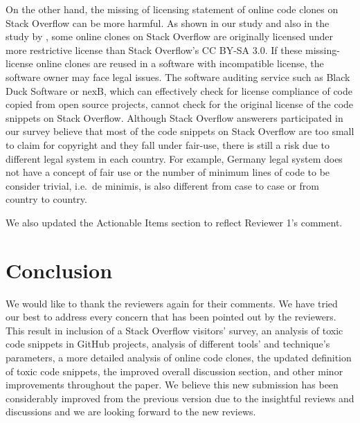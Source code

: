 \documentclass[a4paper,twoside,10pt]{reviewresponse}
\begin{document}
On the other hand, the missing of licensing statement of online code clones on Stack Overflow can be more harmful. As shown in our study and also in the study by \cite{An2017}, some online clones on Stack Overflow are originally licensed under more restrictive license than Stack Overflow's CC BY-SA 3.0. If these missing-license online clones are reused in a software with incompatible license, the software owner may face legal issues. The software auditing service such as Black Duck Software or nexB, which can effectively check for license compliance of code copied from open source projects, cannot check for the original license of the code snippets on Stack Overflow. Although Stack Overflow answerers participated in our survey believe that most of the code snippets on Stack Overflow are too small to claim for copyright and they fall under fair-use, there is still a risk due to different legal system in each country. For example, Germany legal system does not have a concept of fair use or the number of minimum lines of code to be consider trivial, i.e.~de minimis, is also different from case to case or from country to country. 

We also updated the Actionable Items section to reflect Reviewer 1's comment.

\vspace{1cm}

\section{Conclusion}
We would like to thank the reviewers again for their comments.
We have tried our best to address every concern that has been pointed out by the reviewers. This result in inclusion of a Stack Overflow visitors' survey, an analysis of toxic code snippets in GitHub projects, analysis of different tools' and technique's parameters, a more detailed analysis of online code clones, the updated definition of toxic code snippets, the improved overall discussion section, and other minor improvements throughout the paper.
We believe this new submission has been considerably improved from the previous version due to the insightful reviews and discussions and we are looking forward to the new reviews.

%


\end{document}
